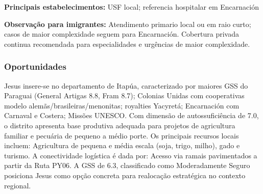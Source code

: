 \textbf{Principais estabelecimentos:} USF local; referencia hospitalar
em Encarnación

\textbf{Observação para imigrantes:} Atendimento primario local ou em
raio curto; casos de maior complexidade seguem para Encarnación.
Cobertura privada continua recomendada para especialidades e urgências
de maior complexidade.
\newpage

\subsubsection*{Oportunidades}\label{oport-jesus-0715}
Jesus insere-se no departamento de Itapúa, caracterizado por maiores GSS do Paraguai (General Artigas 8.8, Fram 8.7); Colonias Unidas com cooperativas modelo alemãs/brasileiras/menonitas; royalties Yacyretá; Encarnación com Carnaval e Costera; Missões UNESCO. Com dimensão de autossuficiência de 7.0, o distrito apresenta base produtiva adequada para projetos de agricultura familiar e pecuária de pequeno a médio porte. Os principais recursos locais incluem: Agricultura de pequena e média escala (soja, trigo, milho), gado e turismo. A conectividade logística é dada por: Acesso via ramais pavimentados a partir da Ruta PY06. A GSS de 6.3, classificado como Moderadamente Seguro posiciona Jesus como opção concreta para realocação estratégica no contexto regional.

